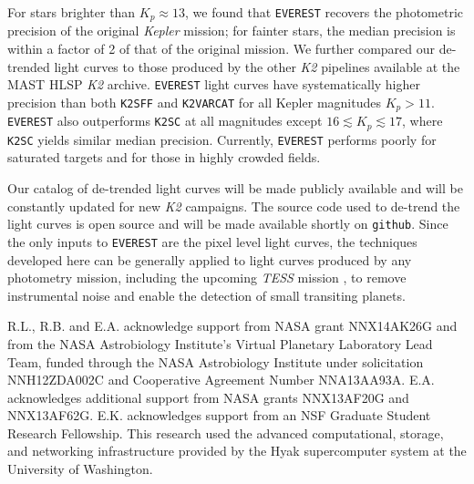 \documentclass[]{emulateapj}
\newcommand{\note}[1]{{\color{red} #1}}
\begin{document}
For stars brighter than $K_p \approx 13$, we found that \texttt{EVEREST} recovers the 
photometric precision of the original \emph{Kepler} mission; for fainter stars, the 
median precision is within a factor of 2 of that of the original mission.
We further compared our de-trended light curves to those produced by the other \emph{K2} pipelines
available at the MAST HLSP \emph{K2} archive.
\texttt{EVEREST} light curves have systematically higher precision than both \texttt{K2SFF}
and \texttt{K2VARCAT} for all Kepler magnitudes $K_p > 11$. \texttt{EVEREST} also outperforms
\texttt{K2SC} at all magnitudes except $16 \lesssim K_p \lesssim 17$, where \texttt{K2SC}
yields similar median precision. Currently, \texttt{EVEREST}
performs poorly for saturated targets and for those in highly crowded fields.

%
%
%
Our catalog of de-trended light curves will be made publicly available and will be constantly
updated for new \emph{K2} campaigns. The source code used to de-trend the light curves
is open source and will be made available shortly on \texttt{github}. Since the only
inputs to \texttt{EVEREST} are the pixel level light curves, the techniques developed
here can be generally applied to light curves produced by any photometry mission,
including the upcoming \emph{TESS} mission \citep{RIC15}, to remove instrumental noise
and enable the detection of small transiting planets.

\begin{acknowledgments}
R.L., R.B. and E.A. acknowledge support from NASA grant NNX14AK26G
and from the NASA Astrobiology
Institute's Virtual Planetary Laboratory Lead Team, funded
through the NASA Astrobiology Institute under solicitation
NNH12ZDA002C and Cooperative Agreement Number
NNA13AA93A. E.A. acknowledges additional support from NASA grants 
NNX13AF20G and NNX13AF62G. E.K. acknowledges support from an NSF 
Graduate Student Research Fellowship.
This research used the advanced computational,
storage, and networking infrastructure provided by the
Hyak supercomputer system at the University of Washington.
\end{acknowledgments}



\end{document}
